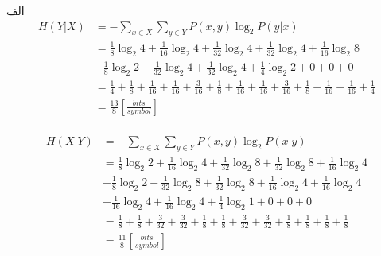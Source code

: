 \SubProblem
{الف}
{
\begin{equation*}
\begin{aligned}
    H(Y|X) &= -\sum_{x \in X}\sum_{y \in Y} P(x,y) \log_2 {P(y|x)} \\
    &= \frac{1}{8}\log_2 4 + \frac{1}{16}\log_2 4 + \frac{1}{32}\log_2 4 + \frac{1}{32}\log_2 4 + \frac{1}{16}\log_2 8 \\
    &+ \frac{1}{8}\log_2 2 + \frac{1}{32}\log_2 4 + \frac{1}{32}\log_2 4 + \frac{1}{4}\log_2 2 + 0 + 0 + 0 \\
    &= \frac{1}{4} + \frac{1}{8} + \frac{1}{16} + \frac{1}{16} + \frac{3}{16} + \frac{1}{8} + \frac{1}{16} + \frac{1}{16} + \frac{3}{16} + \frac{1}{8} + \frac{1}{16} + \frac{1}{16} + \frac{1}{4} \\
    &= \frac{13}{8} [\frac{bits}{symbol}]
\end{aligned}
\end{equation*}
\\
\begin{equation*}
\begin{aligned}
    H(X|Y) &= -\sum_{x \in X}\sum_{y \in Y} P(x,y) \log_2 {P(x|y)} \\
    &= \frac{1}{8}\log_2 2 + \frac{1}{16}\log_2 4 + \frac{1}{32}\log_2 8 + \frac{1}{32}\log_2 8 + \frac{1}{16}\log_2 4 \\
    &+ \frac{1}{8}\log_2 2 + \frac{1}{32}\log_2 8 + \frac{1}{32}\log_2 8 + \frac{1}{16}\log_2 4 + \frac{1}{16}\log_2 4 \\
    &+ \frac{1}{16}\log_2 4 + \frac{1}{16}\log_2 4 + \frac{1}{4}\log_2 1 + 0 + 0 + 0 \\
    &= \frac{1}{8} + \frac{1}{8} + \frac{3}{32} + \frac{3}{32}
    + \frac{1}{8} + \frac{1}{8} + \frac{3}{32} + \frac{3}{32} + \frac{1}{8} + \frac{1}{8} + \frac{1}{8} + \frac{1}{8} \\
    &= \frac{11}{8} [\frac{bits}{symbol}]
\end{aligned}
\end{equation*}
}